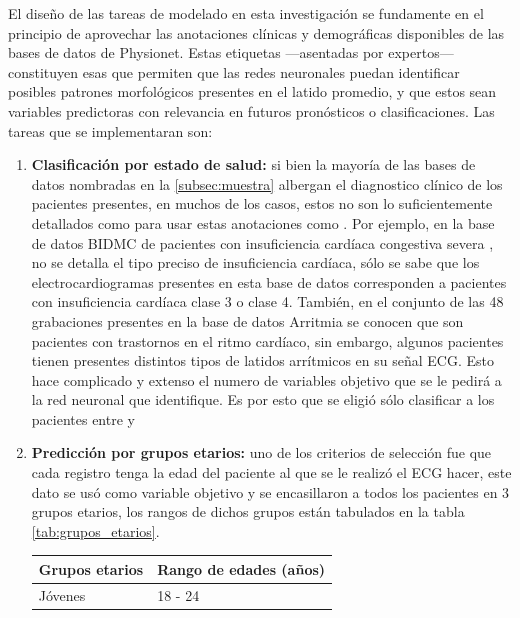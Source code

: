 \documentclass[12pt,letterpaper,oneside,openright]{book}
\begin{document}
El diseño de las tareas de modelado en esta investigación se fundamente en el principio de aprovechar las anotaciones clínicas y demográficas disponibles de las bases de datos de Physionet. Estas etiquetas ---asentadas por expertos--- constituyen esas  que permiten que las redes neuronales puedan identificar posibles patrones morfológicos presentes en el latido promedio, y que estos sean variables predictoras con relevancia en futuros pronósticos o clasificaciones. Las tareas que se implementaran son:
\begin{enumerate}
	\item \label{item:clasificacion_salud} \textbf{Clasificación por estado de salud:} si bien la mayoría de las bases de datos nombradas en la \ref{subsec:muestra} albergan el diagnostico clínico de los pacientes presentes, en muchos de los casos, estos no son lo suficientemente detallados como para usar estas anotaciones como . Por ejemplo, en la base de datos BIDMC de pacientes con insuficiencia cardíaca congestiva severa \cite{InsuficienciaCardiacaDB}, no se detalla el tipo preciso de insuficiencia cardíaca, sólo se sabe que los electrocardiogramas presentes en esta base de datos corresponden a pacientes con insuficiencia cardíaca clase 3 o clase 4. También, en el conjunto de las 48 grabaciones presentes en la base de datos Arritmia \cite{arritmiadb} se conocen que son pacientes con trastornos en el ritmo cardíaco, sin embargo, algunos pacientes tienen presentes distintos tipos de latidos arrítmicos en su señal ECG. Esto hace complicado y extenso el numero de variables objetivo que se le pedirá a la red neuronal que identifique. Es por esto que se eligió sólo clasificar a los pacientes entre  y 
	\item \textbf{Predicción por grupos etarios:} uno de los criterios de selección fue que cada registro tenga la edad del paciente al que se le realizó el ECG hacer, este dato se usó como variable objetivo y se encasillaron a todos los pacientes en 3 grupos etarios, los rangos de dichos grupos están tabulados en la tabla \ref{tab:grupos_etarios}.
	\begin{table}[ht]
		\renewcommand{\arraystretch}{1.2}
		\begin{center}
			\begin{tabular}{| M{3cm} | M{2cm} |}
				\hline
				\textbf{Grupos etarios} & \textbf{Rango de edades (años)} \\ \hline
				Jóvenes & 18 - 24 \\ \hline

\end{tabular}
\end{center}
\end{table}
\end{enumerate}
\end{document}
